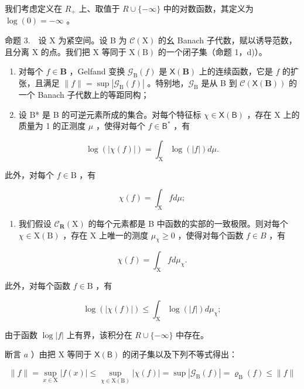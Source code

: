 我们考虑定义在 \(R_{+}\) 上、取值于 \(R \cup \{-\infty\}\) 中的对数函数，其定义为 \(\log(0) = -\infty\) 。

命题 3.　设 X 为紧空间。设 B 为 \(\mathcal{C}(\mathrm{X})\) 的幺 Banach 子代数，赋以诱导范数，且分离 X 的点。我们把 X 等同于 \(\mathrm{X(B)}\) 的一个闭子集（命题 1，d)）。

\begin{enumerate}
\def\labelenumi{\alph{enumi})}
\item
  对每个 \(f \in \mathbf{B}\) ，Gelfand 变换 \(\mathcal{G}_{\mathrm{B}}(f)\) 是 \(\mathsf{X}(\mathbf{B})\) 上的连续函数，它是 \(f\) 的扩张，且满足 \(\| f \| = \sup |\mathcal{G}_{\mathrm{B}}(f)|\) 。特别地，\(\mathcal{G}_{\mathrm{B}}\) 是从 B 到 \(\mathcal{C}(\mathsf{X}(\mathbf{B}))\) 的一个 Banach 子代数上的等距同构；
\item
  设 B* 是 B 的可逆元素所成的集合。对每个特征标 \(\chi \in \mathsf{X}(\mathsf{B})\) ，存在 X 上的质量为 1 的正测度 \(\mu\) ，使得对每个 \(f \in \mathsf{B}^*\) ，有
\end{enumerate}

\[
\log (| \chi (f) |) = \int_ {\mathrm{X}} \log (| f |) d \mu .
\]

此外，对每个 \(f \in \mathrm{B}\) ，有

\[
\chi (f) = \int_ {\mathrm{X}} f d \mu ;
\]

\begin{enumerate}
\def\labelenumi{\alph{enumi})}
\setcounter{enumi}{2}
\tightlist
\item
  我们假设 \(\mathcal{C}_{\mathbf{R}}(\mathrm{X})\) 的每个元素都是 B 中函数的实部的一致极限。则对每个 \(\chi \in \mathrm{X}(\mathrm{B})\) ，存在 X 上唯一的测度 \(\mu_{\chi} \geqslant 0\) ，使得对每个函数 \(f \in B\) ，有
\end{enumerate}

\[
\chi (f) = \int_ {\mathrm{X}} f d \mu_ {\chi}.
\]

此外，对每个函数 \(f \in \mathrm{B}\) ，有

\[
\log (| \chi (f) |) \leqslant \int_ {\mathrm{X}} \log (| f |) d \mu_ {\chi};
\]

由于函数 \(\log|f|\) 上有界，该积分在 \(R \cup \{-\infty\}\) 中存在。

断言 \(a\) ）由把 X 等同于 \(\mathsf{X}(\mathsf{B})\) 的闭子集以及下列不等式得出：

\[
\| f \| = \sup _ {x \in \mathrm{X}} | f (x) | \leqslant \sup _ {\chi \in \mathrm{X} (\mathrm{B})} | \chi (f) | = \sup | \mathcal {G} _ {\mathrm{B}} (f) | = \varrho_ {\mathrm{B}} (f) \leqslant \| f \|
\]

